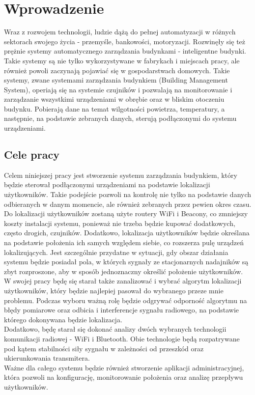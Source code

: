 \chapter{Wprowadzenie}
\label{cha:wprowadzenie}

Wraz z rozwojem technologii, ludzie dążą do pełnej automatyzacji w różnych sektorach swojego życia - przemyśle, bankowości, motoryzacji. Rozwinęły się też prężnie systemy automatycznego zarządzania budynkami - inteligentne budynki. Takie systemy są nie tylko wykorzystywane w fabrykach i miejscach pracy, ale również powoli zaczynają pojawiać się w gospodarstwach domowych. Takie systemy, zwane systemami zarządzania budynkiem (Building Management System), operiają się na systemie czujników i pozwalają na monitorowanie i zarządzanie wszystkimi urządzeniami w obrębie oraz w bliskim otoczeniu budynku. Pobierają dane na temat wilgotności powietrza, temperatury, a następnie, na podstawie zebranych danych, sterują podłączonymi do systemu urządzeniami.


\section{Cele pracy}
\label{sec:celePracy}

Celem niniejszej pracy jest stworzenie systemu zarządzania budynkiem, który będzie sterował podłączonymi urządzeniami na podstawie lokalizacji użytkowników. Takie podejście pozwoli na kontrolę nie tylko na podstawie danych odbieranych w danym momencie, ale również zebranych przez pewien okres czasu. Do lokalizacji użytkowników zostaną użyte routery WiFi i Beacony, co zmniejszy koszty instalacji systemu, ponieważ nie trzeba będzie kupować dodatkowych, często drogich, czujników. Dodatkowo, lokalizacja użytkowników będzie określana na podstawie położenia ich samych względem siebie, co rozszerza pulę urządzeń lokalizujących. Jest szczególnie przydatne w sytuacji, gdy obszar działania systemu będzie posiadał pola, w których sygnały ze stacjonarnych nadajników są zbyt rozproszone, aby w sposób jednoznaczny określić położenie użytkowników.\\
W swojej pracy będę się starał także zanalizować i wybrać algorytm lokalizacji użytkowników, który będzie najlepiej pasował do wybranego przeze mnie problemu. Podczas wyboru ważną rolę będzie odgrywać odporność algorytmu na błędy pomiarowe oraz odbicia i interferencje sygnału radiowego, na podstawie którego dokonywana będzie lokalizacja.\\
Dodatkowo, będę starał się dokonać analizy dwóch wybranych technologii komunikacji radiowej - WiFi i Bluetooth. Obie technologie będą rozpatrywane pod kątem stabilności siły sygnału w zależności od przeszkód oraz ukierunkowania transmitera.\\
Ważne dla całego systemu będzie również stworzenie aplikacji administracyjnej, która pozwoli na konfigurację, monitorowanie położenia oraz analizę przepływu użytkowników.\\